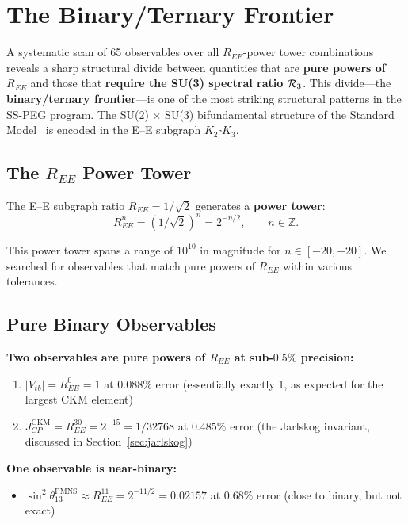 \section{The Binary/Ternary Frontier}\label{sec:binary_frontier}

A systematic scan of 65 observables over all $R_{EE}$-power tower combinations reveals a sharp structural divide between quantities that are \textbf{pure powers of $R_{EE}$} and those that \textbf{require the SU(3) spectral ratio $\mathcal{R}_3$}. This divide---the \textbf{binary/ternary frontier}---is one of the most striking structural patterns in the SS-PEG program. The SU(2) $\times$ SU(3) bifundamental structure of the Standard Model~\cite{connes1994noncommutative,chamseddine1997spectral} is encoded in the E--E subgraph $K_2 \square K_3$.

\subsection{The $R_{EE}$ Power Tower}\label{sec:ree_tower}

The E--E subgraph ratio $R_{EE} = 1/\sqrt{2}$ generates a \textbf{power tower}:
\begin{equation}
R_{EE}^n = (1/\sqrt{2})^n = 2^{-n/2}, \qquad n \in \mathbb{Z}.
\end{equation}

This power tower spans a range of $10^{10}$ in magnitude for $n \in [-20, +20]$. We searched for observables that match pure powers of $R_{EE}$ within various tolerances.

\subsection{Pure Binary Observables}\label{sec:pure_binary}

\textbf{Two observables are pure powers of $R_{EE}$ at sub-$0.5\%$ precision:}

\begin{enumerate}
\item $|V_{tb}| = R_{EE}^0 = 1$ at $0.088\%$ error (essentially exactly 1, as expected for the largest CKM element)
\item $J_{CP}^{\mathrm{CKM}} = R_{EE}^{30} = 2^{-15} = 1/32768$ at $0.485\%$ error (the Jarlskog invariant, discussed in Section~\ref{sec:jarlskog})
\end{enumerate}

\textbf{One observable is near-binary:}

\begin{itemize}
\item $\sin^2\theta_{13}^{\mathrm{PMNS}} \approx R_{EE}^{11} = 2^{-11/2} = 0.02157$ at $0.68\%$ error (close to binary, but not exact)
\end{itemize}

